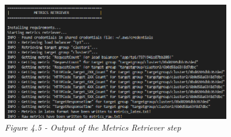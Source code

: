 \begin{center}\centering\includegraphics[width=10cm]{Resources/metrics.png}\\\emph{Figure 4.5 - Output of the Metrics Retriever step}\end{center}\\


